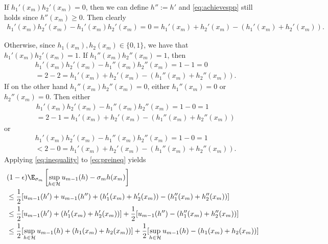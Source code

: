 \begin{enumerate}
    If $h_1'(x_m)h_2'(x_m) = 0$, then we can define $h'':=h'$
    and \autoref{eq:achievespp} still holds since $h''(x_m) \geq 0$.
    Then clearly
    \begin{align}
        h_1'(x_m)h_2'(x_m) - h_1'(x_m)h_2'(x_m)
        = 0 = h_1'(x_m) + h_2'(x_m) - (h_1'(x_m) + h_2'(x_m)).
        \nonumber
    \end{align}
    
    Otherwise, since $h_1(x_m), h_2(x_m) \in \{0,1\}$,
    we have that $h_1'(x_m)h_2'(x_m)=1$.
    If $h_1''(x_m) h_2''(x_m) = 1$, then 
    \begin{align}
        &h_1'(x_m)h_2'(x_m) - h_1''(x_m)h_2''(x_m) = 1-1 =0
        \nonumber \\
        &= 2 - 2 = h_1'(x_m) + h_2'(x_m) - (h_1''(x_m) + h_2''(x_m)).
        \nonumber
    \end{align}
    If on the other hand $h_1''(x_m) h_2''(x_m) = 0$,
    either $h_1''(x_m)=0$ or $h_2''(x_m) = 0$.
    Then either
    \begin{align}
        &h_1'(x_m)h_2'(x_m) - h_1''(x_m)h_2''(x_m) = 1-0 =1
        \nonumber \\
        &= 2 - 1 = h_1'(x_m) + h_2'(x_m) - (h_1''(x_m) + h_2''(x_m))
        \nonumber
    \end{align}
    or
    \begin{align}
        &h_1'(x_m)h_2'(x_m) - h_1''(x_m)h_2''(x_m) = 1-0 =1
        \nonumber \\
        &< 2 - 0 = h_1'(x_m) + h_2'(x_m) - (h_1''(x_m) + h_2''(x_m)).
        \nonumber
    \end{align}
    Applying \autoref{eq:inequality} to \autoref{eq:preineq}
    yields
    \begin{align}
        &(1-\epsilon) \E_{\sigma_m} \left[
        \sup_{h \in \mathcal{H}}
        u_{m-1}(h) - \sigma_m h(x_m)
        \right] \nonumber \\
        &\leq \frac{1}{2}
        [u_{m-1}(h') + u_{m-1}(h'')
        + (h_1'(x_m)+h_2'(x_m)) - (h_1''(x_m)+h_2''(x_m))]
        \nonumber \\
        &\leq \frac{1}{2}
        [u_{m-1}(h') + (h_1'(x_m)+h_2'(x_m))]
        + \frac{1}{2}
        [u_{m-1}(h'') - (h_1''(x_m)+h_2''(x_m))]
        \nonumber \\
        &\leq \frac{1}{2}
        [\sup_{h \in \mathcal{H}}
        u_{m-1}(h) + (h_1(x_m)+h_2(x_m))]
        + \frac{1}{2}[\sup_{h \in \mathcal{H}}
        u_{m-1}(h) - (h_1(x_m)+h_2(x_m))]
        \nonumber \\

\end{align}
\end{enumerate}
